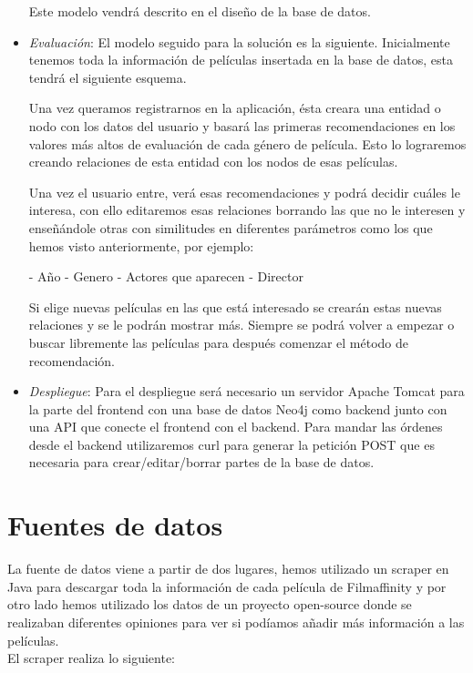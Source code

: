 \documentclass[12pt,a4paper]{article}
\begin{document}
\begin{itemize}
			Este modelo vendrá descrito en el diseño de la base de datos.
			\item \textit{Evaluación}: 
			El modelo seguido para la solución es la siguiente. Inicialmente tenemos toda la información de películas insertada en la base de datos, esta tendrá el siguiente esquema.
			
			Una vez queramos registrarnos en la aplicación, ésta creara una entidad o nodo con los datos del usuario y basará las primeras recomendaciones en los valores más altos de evaluación de cada género de película. Esto lo lograremos creando relaciones de esta entidad con los nodos de esas películas. 
			
			Una vez el usuario entre, verá esas recomendaciones y podrá decidir cuáles le interesa, con ello editaremos esas relaciones borrando las que no le interesen y enseñándole otras con similitudes en diferentes parámetros como los que hemos visto anteriormente, por ejemplo:

			\subitem - Año
			\subitem - Genero
			\subitem - Actores que aparecen
			\subitem - Director
			
			Si elige nuevas películas en las que está interesado se crearán estas nuevas relaciones y se le podrán mostrar más. Siempre se podrá volver a empezar o buscar libremente las películas para después comenzar el método de recomendación.
			\item \textit{Despliegue}: 
			Para el despliegue será necesario un servidor Apache Tomcat para la parte del frontend con una base de datos Neo4j como backend junto con una API que conecte el frontend con el backend. 
			Para mandar las órdenes desde el backend utilizaremos curl para generar la petición POST que es necesaria para crear/editar/borrar partes de la base de datos.		
			
		\end{itemize}
		\clearpage
		\section{Fuentes de datos}
		
		La fuente de datos viene a partir de dos lugares, hemos utilizado un scraper en Java para descargar toda la información de cada película de Filmaffinity y por otro lado hemos utilizado los datos de un proyecto open-source donde se realizaban diferentes opiniones para ver si podíamos añadir más información a las películas.\\
		
		El scraper realiza lo siguiente:
		
\end{document}
